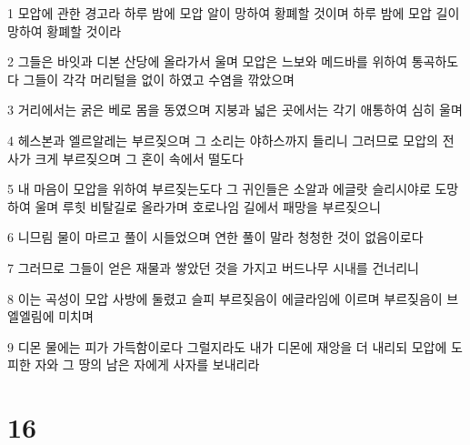 \par 1 모압에 관한 경고라 하루 밤에 모압 알이 망하여 황폐할 것이며 하루 밤에 모압 길이 망하여 황폐할 것이라
\par 2 그들은 바잇과 디본 산당에 올라가서 울며 모압은 느보와 메드바를 위하여 통곡하도다 그들이 각각 머리털을 없이 하였고 수염을 깎았으며
\par 3 거리에서는 굵은 베로 몸을 동였으며 지붕과 넓은 곳에서는 각기 애통하여 심히 울며
\par 4 헤스본과 엘르알레는 부르짖으며 그 소리는 야하스까지 들리니 그러므로 모압의 전사가 크게 부르짖으며 그 혼이 속에서 떨도다
\par 5 내 마음이 모압을 위하여 부르짖는도다 그 귀인들은 소알과 에글랏 슬리시야로 도망하여 울며 루힛 비탈길로 올라가며 호로나임 길에서 패망을 부르짖으니
\par 6 니므림 물이 마르고 풀이 시들었으며 연한 풀이 말라 청청한 것이 없음이로다
\par 7 그러므로 그들이 얻은 재물과 쌓았던 것을 가지고 버드나무 시내를 건너리니
\par 8 이는 곡성이 모압 사방에 둘렸고 슬피 부르짖음이 에글라임에 이르며 부르짖음이 브엘엘림에 미치며
\par 9 디몬 물에는 피가 가득함이로다 그럴지라도 내가 디몬에 재앙을 더 내리되 모압에 도피한 자와 그 땅의 남은 자에게 사자를 보내리라

\chapter{16}

